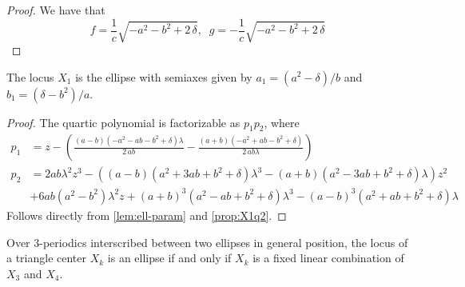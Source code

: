 \begin{proof}
We have that
\[f={\frac {1}{c}\sqrt {-{a}^{2}-{b}^{2}+2\,\delta}}, \;\; g= -{\frac {1}{c}\sqrt {-{a}^{2}-{b}^{2}+2\,\delta}}\]

\end{proof}

\begin{corollary}
The locus $X_1$ is the ellipse with semiaxes given by $a_1=(a^2-\delta)/b$ and $b_1=(\delta-b^2)/a.$

 
\end{corollary}

\begin{proof}
The quartic polynomial is factorizable as $p_1p_2$, where
\begin{align*}
    p_1&=z-\left({\frac { \left( a-b \right)  \left( -{a}^{2}-a b-{b}^{2}+\delta
 \right) \lambda}{2\,a b}}-{\frac { \left( a+b \right)  \left( -{a}^{2}
+a b-{b}^{2}+\delta \right) }{2\,a b\lambda}}\right)
\\
    p_2&=2 a b \lambda^2 z^3 - ((a - b) (a^2 + 3 a b + b^2 + \delta) \lambda^3 - (a + b) (a^2 - 3 a b + b^2 + \delta) \lambda) z^2\\
    &+ 6 a b  (a^2 - b^2) \lambda^2 z + (a + b)^3 (a^2 - a b + b^2 + \delta) \lambda^3 - (a - b)^3 (a^2 + a b + b^2 + \delta) \lambda
\end{align*}
Follows directly from  \cref{lem:ell-param} and  \cref{prop:X1q2}.
\end{proof}

\cite{schwartz2016-com}

\begin{conjecture}
Over 3-periodics interscribed between two ellipses in general position, the locus of a triangle center $X_k$ is an ellipse if and only if $X_k$ is a fixed linear combination of $X_3$ and $X_4$.
\end{conjecture}